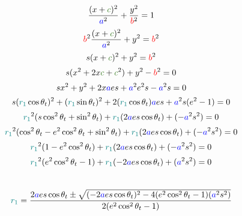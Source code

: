 $$\frac{(x+\textcolor{OliveGreen}{c})^2}{\textcolor{blue}{a}^2} + \frac{y^2}{\textcolor{red}{b}^2} = 1$$
$$\textcolor{red}{b}^2\frac{(x+\textcolor{OliveGreen}{c})^2}{\textcolor{blue}{a}^2} + y^2 = \textcolor{red}{b}^2$$
$$\textcolor{black}{s}(x+\textcolor{OliveGreen}{c})^2 + y^2 = \textcolor{red}{b}^2$$
$$\textcolor{black}{s}(x^2+ 2x\textcolor{OliveGreen}{c} +\textcolor{OliveGreen}{c}^2) + y^2 - \textcolor{red}{b}^2 = 0$$
$$\textcolor{black}{s}x^2+ y^2+ 2x\textcolor{blue}{a}\textcolor{black}{e}\textcolor{black}{s} +\textcolor{blue}{a}^2\textcolor{black}{e}^2\textcolor{black}{s} - \textcolor{blue}{a}^2\textcolor{black}{s} = 0$$
$$\textcolor{black}{s}(\textcolor{teal}{r_1}\cos{\textcolor{black}{\theta_t}})^2+ (\textcolor{teal}{r_1}\sin{\textcolor{black}{\theta_t}})^2+ 2(\textcolor{teal}{r_1}\cos{\textcolor{black}{\theta_t}})\textcolor{blue}{a}\textcolor{black}{e}\textcolor{black}{s} +\textcolor{blue}{a}^2\textcolor{black}{s}(\textcolor{black}{e}^2 - 1) = 0$$
$$\textcolor{teal}{r_1}^2(\textcolor{black}{s}\cos^2{\textcolor{black}{\theta_t}} + \sin^2{\textcolor{black}{\theta_t}})+ \textcolor{teal}{r_1}(2\textcolor{blue}{a}\textcolor{black}{e}\textcolor{black}{s}\cos{\textcolor{black}{\theta_t}}) +(-\textcolor{blue}{a}^2\textcolor{black}{s}^2) = 0$$
$$\textcolor{teal}{r_1}^2(\cos^2{\textcolor{black}{\theta_t}} - \textcolor{black}{e}^2\cos^2{\textcolor{black}{\theta_t}} + \sin^2{\textcolor{black}{\theta_t}})+ \textcolor{teal}{r_1}(2\textcolor{blue}{a}\textcolor{black}{e}\textcolor{black}{s}\cos{\textcolor{black}{\theta_t}}) +(-\textcolor{blue}{a}^2\textcolor{black}{s}^2) = 0$$
$$\textcolor{teal}{r_1}^2(1 - \textcolor{black}{e}^2\cos^2{\textcolor{black}{\theta_t}})+ \textcolor{teal}{r_1}(2\textcolor{blue}{a}\textcolor{black}{e}\textcolor{black}{s}\cos{\textcolor{black}{\theta_t}}) +(-\textcolor{blue}{a}^2\textcolor{black}{s}^2) = 0$$
$$\textcolor{teal}{r_1}^2(\textcolor{black}{e}^2\cos^2{\textcolor{black}{\theta_t}} - 1)+ \textcolor{teal}{r_1}(-2\textcolor{blue}{a}\textcolor{black}{e}\textcolor{black}{s}\cos{\textcolor{black}{\theta_t}}) +(\textcolor{blue}{a}^2\textcolor{black}{s}^2) = 0$$
\\
$$\textcolor{teal}{r_1} = \frac{2\textcolor{blue}{a}\textcolor{black}{e}\textcolor{black}{s}\cos{\textcolor{black}{\theta_t}}\pm\sqrt{(-2\textcolor{blue}{a}\textcolor{black}{e}\textcolor{black}{s}\cos{\textcolor{black}{\theta_t}})^2 - 4(\textcolor{black}{e}^2\cos^2{\textcolor{black}{\theta_t}}-1)(\textcolor{blue}{a}^2\textcolor{black}{s}^2)}}{2(\textcolor{black}{e}^2\cos^2{\textcolor{black}{\theta_t}}-1)}$$

